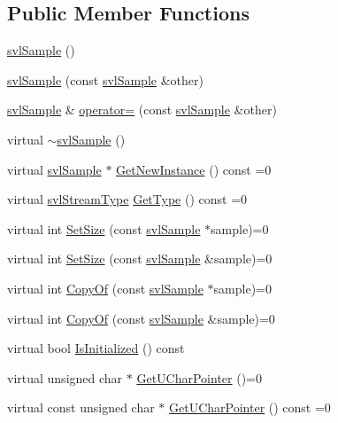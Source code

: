 \subsection*{Public Member Functions}
\begin{DoxyCompactItemize}
\item 
\hyperlink{classsvl_sample_a4e072ee82d46decf6d5ac224a2c04b78}{svl\+Sample} ()
\item 
\hyperlink{classsvl_sample_a1a7bf4e2ef82f29f9e1f456da653b106}{svl\+Sample} (const \hyperlink{classsvl_sample}{svl\+Sample} \&other)
\item 
\hyperlink{classsvl_sample}{svl\+Sample} \& \hyperlink{classsvl_sample_a3048daed69fc0bce5e48db36d924ddde}{operator=} (const \hyperlink{classsvl_sample}{svl\+Sample} \&other)
\item 
virtual \hyperlink{classsvl_sample_ac5d4e50a98b75d7338ecd470a12e6ed9}{$\sim$svl\+Sample} ()
\item 
virtual \hyperlink{classsvl_sample}{svl\+Sample} $\ast$ \hyperlink{classsvl_sample_a1f6cc4075c22bbaa4a4225f1079bca59}{Get\+New\+Instance} () const =0
\item 
virtual \hyperlink{svl_definitions_8h_aa00696d338a58db361335a01fd11e122}{svl\+Stream\+Type} \hyperlink{classsvl_sample_ab2ab29d5dcd80646f29955bc103cf927}{Get\+Type} () const =0
\item 
virtual int \hyperlink{classsvl_sample_a4a4c91f6bca2ece232fbbc745cf710f4}{Set\+Size} (const \hyperlink{classsvl_sample}{svl\+Sample} $\ast$sample)=0
\item 
virtual int \hyperlink{classsvl_sample_a10f80eb24f0d8d2eba304dc6e3c46252}{Set\+Size} (const \hyperlink{classsvl_sample}{svl\+Sample} \&sample)=0
\item 
virtual int \hyperlink{classsvl_sample_aa80a261472f0e0dd1bf7ecd25ee40bda}{Copy\+Of} (const \hyperlink{classsvl_sample}{svl\+Sample} $\ast$sample)=0
\item 
virtual int \hyperlink{classsvl_sample_a79831d7302d638ba99be09ba19ebf7b6}{Copy\+Of} (const \hyperlink{classsvl_sample}{svl\+Sample} \&sample)=0
\item 
virtual bool \hyperlink{classsvl_sample_adf73a72c661e6df3c5f51a36c55040bb}{Is\+Initialized} () const 
\item 
virtual unsigned char $\ast$ \hyperlink{classsvl_sample_a1d6d0bcdc9c59c719151fdef2b41fb07}{Get\+U\+Char\+Pointer} ()=0
\item 
virtual const unsigned char $\ast$ \hyperlink{classsvl_sample_a1709332c9744a208763d49707f9a180b}{Get\+U\+Char\+Pointer} () const =0

\end{DoxyCompactItemize}
